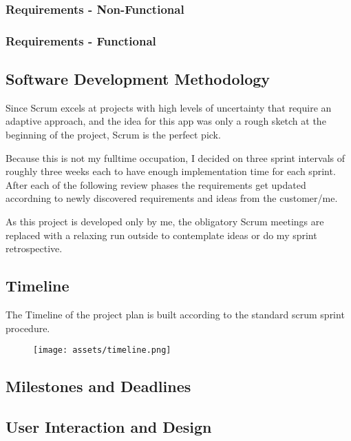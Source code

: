 \subsubsection{Requirements - Non-Functional}


\newpage
\subsubsection{Requirements - Functional}


\subsection{Software Development Methodology}
Since Scrum excels at projects with high levels of uncertainty that require an adaptive approach, and the idea for this app was only a rough sketch at the beginning of the project, Scrum is the perfect pick.

Because this is not my fulltime occupation, I decided on three sprint intervals of roughly three weeks each to have enough implementation time for each sprint. After each of the following review phases the requirements get updated accordning to newly discovered requirements and ideas from the customer/me.

As this project is developed only by me, the obligatory Scrum meetings are replaced with a relaxing run outside to contemplate ideas or do my sprint retrospective.

\subsection{Timeline}
The Timeline of the project plan is built according to the standard scrum sprint procedure.
\begin{figure}[!h]
    \centering
    \texttt{[image: assets/timeline.png]}
    \label{fig:timeline}
\end{figure}

\subsection{Milestones and Deadlines}


\newpage
\subsection{ User Interaction and Design}

